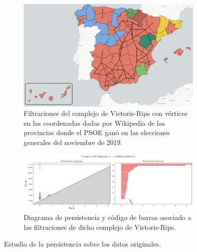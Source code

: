 \newpage
\null
\vspace*{\fill}
\begin{figure}[!ht]
\centering
\begin{subfigure}[b]{\textwidth}
	\centering
	\includegraphics[width=\textwidth]{include/figuras/mapaWikipedia.png} 
	\caption{Filtraciones del complejo de Vietoris-Rips con vértices en las coordenadas dadas por Wikipedia de las provincias donde el PSOE ganó en las elecciones generales del noviembre de 2019.}
	\label{ref:mapaWiki}
\end{subfigure}
\begin{subfigure}[b]{\textwidth}
	\centering
	\includegraphics[width=\textwidth]{../code/output/ejemploMapa.png} 
	\caption{Diagrama de persistencia y código de barras asociado a las filtraciones de dicho complejo de Vietoris-Rips.}
	\label{ref:persMapaWiki}
\end{subfigure}
\caption{Estudio de la persistencia sobre los datos originales.}
\label{ref:figMapaWiki}
\end{figure} 
\vspace*{\fill}
\newpage
